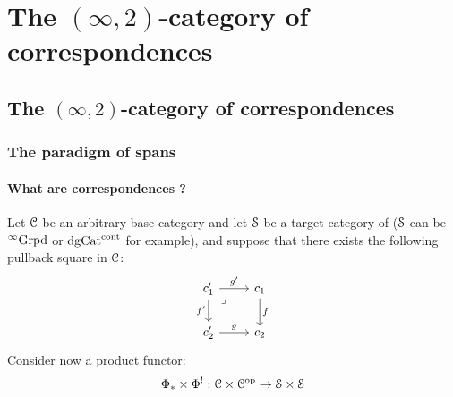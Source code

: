 \chapter{The \texorpdfstring{$(\infty, 2)$}{}-category of correspondences}
    \begin{abstract}
        
    \end{abstract}
    
    \minitoc

    \section{The \texorpdfstring{$(\infty, 2)$}{}-category of correspondences}
        \subsection{The paradigm of spans}
            \subsubsection{What are correspondences ?}
                \begin{remark} \label{remark: why_correspondences}
                    Let $\C$ be an arbitrary base category and let $\S$ be a target category of  ($\S$ can be ${}^{\infty}\Grpd$ or $\dg\Cat^{\cont}$ for example), and suppose that there exists the following pullback square in $\C$:
                        $$
                            \begin{tikzcd}
                            	{c_1'} & {c_1} \\
                            	{c_2'} & {c_2}
                            	\arrow["f", from=1-2, to=2-2]
                            	\arrow["g", from=2-1, to=2-2]
                            	\arrow["{f'}"', from=1-1, to=2-1]
                            	\arrow["{g'}", from=1-1, to=1-2]
                            	\arrow["\lrcorner"{anchor=center, pos=0.125}, draw=none, from=1-1, to=2-2]
                            \end{tikzcd}
                        $$
                    Consider now a product functor:
                        $$\Phi_* \x \Phi^!: \C \x \C^{\op} \to \S \x \S$$
                    
                \end{remark}
            
